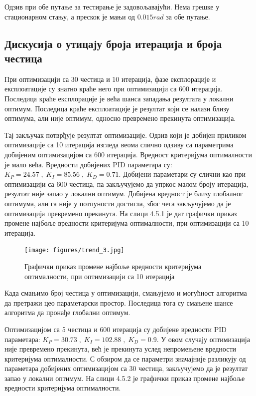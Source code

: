 \documentclass[12pt]{article}
\begin{document}
Одзив при обе путање за тестирање је задовољавајући. Нема грешке у стационарном стању, а прескок је мањи од $0.015 rad$ за обе путање.


\subsection{Дискусија о утицају броја итерација и броја честица}
При оптимизацији са 30 честица и 10 итерација, фазе експлорације и експлоатације су знатно краће него при оптимизацији са 600 итерација. Последица краће експлорације је већа шанса западања резултата у локални оптимум. Последица краће експлоатације је резултат који се налази близу оптимума, али није оптимум, односно превремено прекинута оптимизација.

Тај закључак потврђује резултат оптимизације. Одзив који је добијен приликом оптимизације са 10 итерација изгледа веома слично одзиву са параметрима добијеним оптимизацијом са 600 итерација. Вредност критеријума оптималности је мало већа. Вредности добијених PID параметара су: $K_P=24.57\;,\;K_I=85.56\;,\;K_D=0.71$. Добијени параметари су слични као при оптимизацији са 600 честица, па закључујемо да упркос малом броју итерација, резултат није запао у локални оптимум. Добијена вредност је близу глобалног оптимума, али га није у потпуности достигла, због чега закључујемо да је оптимизација превремено прекинута. На слици 4.5.1 је дат графички приказ промене најбоље вредности критеријума оптималности, при оптимизацији са 10 итерација.

\begin{figure}[H]
    \centering
    \texttt{[image: figures/trend\_3.jpg]}
    \caption{Графички приказ промене најбоље вредности критеријума оптималности, при оптимизацији са 10 итерација}
    \label{fig:trend_3}
\end{figure}

Када смањимо број честица у оптимизацији, смањујемо и могућност алгоритма да претражи цео параметарски простор. Последица тога су смањене шансе алгоритма да пронађе глобални оптимум.

Оптимизацијом са 5 честица и 600 итерација су добијене вредности PID параметара: $K_P=30.73\;,\;K_I=102.88\;,\;K_D=0.9$. У овом случају оптимизација није превремено прекинута, већ је прекинута услед непромењене вредности критеријума оптималности. С обзиром да се параметри значајније разликују од параметара добијених оптимизацијом са 30 честица, закључујемо да је резултат запао у локални оптимум. На слици 4.5.2 је графички приказ промене најбоље вредности критеријума оптималности.
\end{document}
